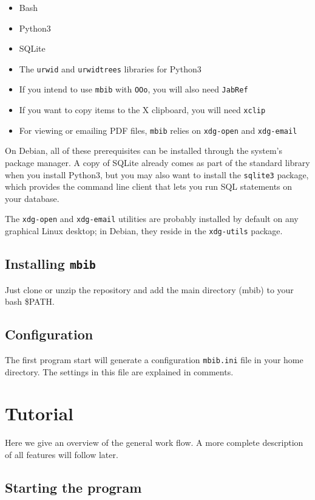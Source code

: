 \documentclass[10pt]{article}
\newcommand*{\mbib}{\texttt{mbib}\xspace}
\newcommand*{\jabref}{\texttt{JabRef}\xspace}
\newcommand*{\ooo}{\texttt{OOo}\xspace}
\begin{document}
\begin{itemize}
\item Bash
\item Python3 
\item SQLite
\item The \texttt{urwid} and \texttt{urwidtrees} libraries for Python3
\item If you intend to use \mbib with \ooo, you will also need \jabref
\item If you want to copy items to the X clipboard, you will need \texttt{xclip}
\item For viewing or emailing PDF files, \mbib relies on \texttt{xdg-open} and \texttt{xdg-email}
\end{itemize}

\noindent On Debian, all of these prerequisites can be installed through the system's package manager. A copy of SQLite already comes as part of the standard library when you install Python3, but you may also want to install the \texttt{sqlite3} package, which provides the command line client that lets you run SQL statements on your database. 

The \texttt{xdg-open} and \texttt{xdg-email} utilities are probably installed by default on any graphical Linux desktop; in Debian, they reside in the \texttt{xdg-utils} package.

\subsection{Installing \mbib}

Just clone or unzip the repository and add the main directory (mbib) to your bash \$PATH. 

\subsection{Configuration}

The first program start will generate a configuration \texttt{mbib.ini} file in your home directory. The settings in this file are explained in comments. 

\section{Tutorial}

Here we give an overview of the general work flow. A more complete description of all features will follow later. 

\subsection{Starting the program}
\end{document}
